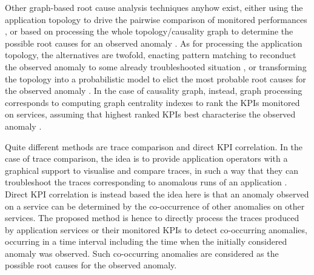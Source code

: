 Other graph-based root cause analysis techniques anyhow exist, either using the application topology to drive the pairwise comparison of monitored performances \cite{30_Thalheim2017_Sieve}, or based on processing the whole topology/causality graph to determine the possible root causes for an observed anomaly
\cite{14_Samir2019_DLA,11_Brandon2020_GraphBasedRootCauseAnalysis,13_Mariani2018_LocalizingFaultsCloudSystems}.
As for processing the application topology, the alternatives are twofold, \viz enacting pattern matching to reconduct the observed anomaly to some already troubleshooted situation \cite{11_Brandon2020_GraphBasedRootCauseAnalysis}, or transforming the topology into a probabilistic model to elict the most probable root causes for the observed anomaly \cite{14_Samir2019_DLA}.
In the case of causality graph, instead, graph processing corresponds to computing graph centrality indexes to rank the KPIs monitored on services, assuming that highest ranked KPIs best characterise the observed anomaly \cite{13_Mariani2018_LocalizingFaultsCloudSystems}. 

Quite different methods are trace comparison and {direct KPI correlation}. 
In the case of trace comparison, the idea is to provide application operators with a graphical support to visualise and compare traces, in such a way that they can troubleshoot the traces corresponding to anomalous runs of an application \cite{01_Zhou2021_FaultAnalysisDebuggingMicroservices,45_Guo2020_GMTA}.
{Direct KPI correlation} is instead based the idea here is that an anomaly observed on a service can be determined by the co-occurrence of other anomalies on other services.
The proposed method is hence to {directly} process the traces produced by application services \cite{41_Mi2013_PerformanceDiagnosisCloud,16_Liu2020_TraceAnomaly} or their monitored KPIs \cite{49_Shan2019_epsilonDiagnosis,20_Wang2020_RootCauseMetricLocation,42_Nguyen2011_PAL,43_Nguyen2013_FChain} to detect co-occurring anomalies, \viz occurring in a time interval including the time when the initially considered anomaly was observed.
Such co-occurring anomalies are considered as the possible root causes for the observed anomaly.

